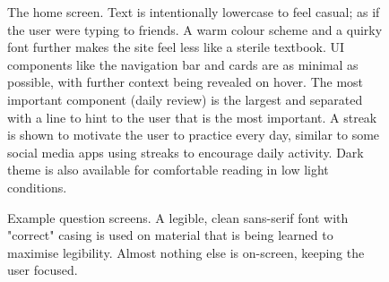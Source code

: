 \documentclass{report}
\begin{document}
\begin{figure}[H]
  \centering
  \label{fig:home1}
  \caption{The home screen. Text is intentionally lowercase to feel casual; as if the user were typing to friends. A warm colour scheme and a quirky font further makes the site feel less like a sterile textbook. UI components like the navigation bar and cards are as minimal as possible, with further context being revealed on hover. The most important component (daily review) is the largest and separated with a line to hint to the user that is the most important. A streak is shown to motivate the user to practice every day, similar to some social media apps using streaks to encourage daily activity. Dark theme is also available for comfortable reading in low light conditions.}
\end{figure}
\begin{figure}[H]
  \centering
  \label{fig:question1}
  \caption{Example question screens. A legible, clean sans-serif font with "correct" casing is used on material that is being learned to maximise legibility. Almost nothing else is on-screen, keeping the user focused.}
\end{figure}
\end{document}
